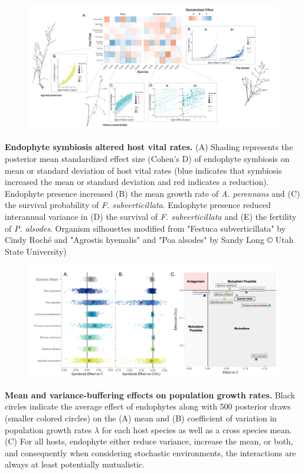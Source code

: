 \documentclass[12pt]{article}
\begin{document}
\begin{figure}
	\centering
	\includegraphics[width=\linewidth]{StochDemo_fig1.png}
\end{figure}
 \textbf{Endophyte symbiosis altered host vital rates.} (A) Shading represents the posterior mean standardized effect size (Cohen's D) of endophyte symbiosis on mean or standard deviation of host vital rates (blue indicates that symbiosis increased the mean or standard deviation and red indicates a reduction). Endophyte presence increased (B) the mean growth rate of \emph{A. perennans} and (C) the survival probability of \emph{F. subverticillata}. Endophyte presence reduced interannual variance in (D) the survival of \emph{F. subverticillata} and (E) the fertility of \emph{P. alsodes}. Organism silhouettes modified from "Festuca subverticillata" by Cindy Roché and "Agrostis hyemalis" and "Poa alsodes" by Sandy Long © Utah State University)
\newpage

\begin{figure}
	\centering
	\includegraphics[width=\linewidth]{StochDemo_fig2.png}
\end{figure}
 \textbf{Mean and variance-buffering effects on population growth rates.} Black circles indicate the average effect of endophytes along with 500 posterior draws (smaller colored circles) on the (A) mean and (B) coefficient of variation in population growth rates $\lambda$ for each host species as well as a cross species mean. (C) For all hosts, endophyte either reduce variance, increase the mean, or both, and consequently when considering stochastic environments, the interactions are always at least potentially mutualistic.
\newpage
\end{document}
